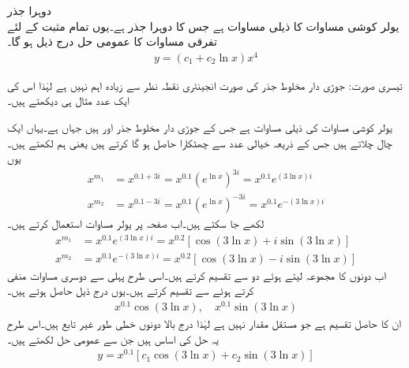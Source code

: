 \quad دوہرا جذر\\
یولر کوشی مساوات  کا ذیلی مساوات  ہے جس کا دوہرا جذر  ہے۔یوں تمام مثبت  کے لئے تفرقی مساوات کا عمومی حل درج ذیل ہو گا۔
\begin{align*}
y=(c_1+c_2\ln x)x^4
\end{align*}


تیسری صورت: جوڑی دار مخلوط جذر کی صورت انجینئری نقطہ نظر سے زیادہ اہم نہیں ہے لہٰذا اس کی ایک عدد مثال ہی دیکھتے ہیں۔

یولر کوشی مساوات  کی   ذیلی مساوات ہے جس کے جوڑی دار مخلوط جذر  اور  ہیں جہاں  ہے۔یہاں ایک چال چلاتے ہیں جس کے ذریعہ خیالی عدد  سے چھٹکارا حاصل ہو گا کرتے ہیں یعنی ہم  لکھتے ہیں۔یوں
\begin{align*}
x^{m_1}&=x^{0.1+3i}=x^{0.1} \left(e^{\ln x}\right)^{3i}=x^{0.1}e^{(3\ln x)i}\\
x^{m_2}&=x^{0.1-3i}=x^{0.1} \left(e^{\ln x}\right)^{-3i}=x^{0.1}e^{-(3\ln x)i}
\end{align*}
لکھے جا سکتے ہیں۔اب صفحہ  پر یولر مساوات  استعمال کرتے ہیں۔
\begin{align*}
x^{m_1}&=x^{0.1}e^{(3\ln x)i}=x^{0.2}[\cos (3\ln x)+i\sin(3\ln x)]\\
x^{m_2}&=x^{0.1}e^{-(3\ln x)i}=x^{0.2}[\cos (3\ln x)-i\sin(3\ln x)]
\end{align*}
اب دونوں کا مجموعہ لیتے ہوئے دو  سے تقسیم کرتے ہیں۔اسی طرح پہلی سے دوسری مساوات منفی کرتے ہوئے  سے تقسیم کرتے ہیں۔یوں درج ذیل حاصل ہوتے ہیں۔
\begin{align*}
x^{0.1}\cos (3\ln x), \quad x^{0.1}\sin (3\ln x)
\end{align*}
ان کا حاصل تقسیم  ہے جو مستقل مقدار نہیں ہے لہٰذا درج بالا دونوں خطی طور غیر تابع ہیں۔اس طرح یہ حل کی اساس ہیں جن سے عمومی حل لکھتے ہیں۔
\begin{align*}
y=x^{0.1}[c_1 \cos (3\ln x)+c_2 \sin (3\ln x)]
\end{align*}
